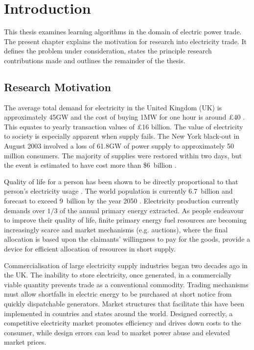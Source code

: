 \chapter{Introduction}
This thesis examines learning algorithms in the domain of electric power
trade.  The present chapter explains the motivation for research into
electricity trade.  It defines the problem under consideration, states the principle
research contributions made and outlines the remainder of the thesis.

\section{Research Motivation}
The average total demand for electricity in the United Kingdom (UK) is
approximately 45GW and the cost of buying 1MW for one hour is around
\pounds40 \cite{decc:dukes09}. This equates to yearly transaction values of
\pounds16 billion.  The value of electricity to society is especially
apparent when supply fails. The New York black-out in August 2003 involved
a loss of 61.8GW of power supply to approximately 50 million consumers.
The majority of supplies were restored within two days, but the event is
estimated to have cost more than \$6~billion \cite{minkel:2008,icf:2003}.

Quality of life for a person has been shown to be directly proportional to that
person's electricity usage \cite{alam:qol}.  The world
population is currently 6.7~billion and forecast to exceed 9~billion by the
year 2050 \cite{un:pop}. Electricity production currently demands over $1/3$ of the annual primary
energy extracted. As people endeavour to improve their quality of life,
finite primary energy fuel resources are becoming increasingly scarce and
market mechanisms (e.g. auctions), where the final allocation is based upon the
claimants' willingness to pay for the goods, provide a device for efficient
allocation of resources in short supply.

Commercialisation of large electricity supply industries began two
decades ago in the UK. The inability to store electricity, once generated, in a
commercially viable quantity prevents trade as a conventional commodity.
Trading mechanisms must allow shortfalls in electric energy to be purchased at
short notice from quickly dispatchable generators.  Market structures
that facilitate this have been implemented in countries and states around the
world.  Designed correctly, a competitive electricity market promotes
efficiency and drives down costs to the consumer, while design errors can
lead to market power abuse and elevated market prices.

